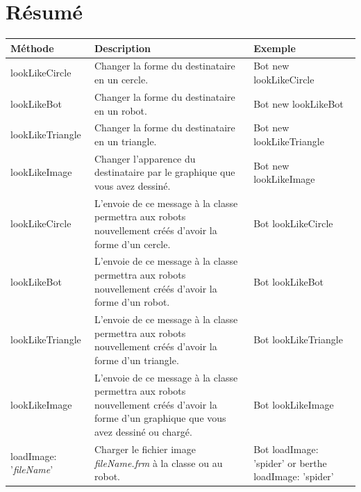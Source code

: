 \documentclass[a4paper,10pt,twoside]{book}
\begin{document}
\section{R\'esum\'e}
\noindent
{\small \begin{tabular}{p{20mm}p{50mm}p{30mm}}
\hline
\textbf{M\'ethode} & \textbf{Description} & \textbf{Exemple}\\
\hline
\textsf{lookLikeCircle} & Changer la forme du destinataire en un cercle. & \textsf{Bot new lookLikeCircle} \\

\textsf{lookLikeBot} & Changer la forme du destinataire en un robot. & \textsf{Bot new lookLikeBot} \\

\textsf{lookLikeTriangle} & Changer la forme du destinataire en un triangle. & \textsf{Bot new lookLikeTriangle} \\

\textsf{lookLikeImage} & Changer l'apparence du destinataire par le graphique que vous avez dessin\'e. & \textsf{Bot new lookLikeImage} \\

\textsf{lookLikeCircle} & L'envoie de ce message \`a la classe permettra aux robots nouvellement cr\'e\'es d'avoir la forme d'un cercle. 
& \textsf{Bot lookLikeCircle} \\

\textsf{lookLikeBot} & L'envoie de ce message \`a la classe permettra aux robots nouvellement cr\'e\'es d'avoir la forme d'un robot. & \textsf{Bot lookLikeBot} \\

\textsf{lookLikeTriangle} & L'envoie de ce message \`a la classe permettra aux robots nouvellement cr\'e\'es d'avoir la forme d'un triangle. 
& \textsf{Bot lookLikeTriangle} \\

\textsf{lookLikeImage} & L'envoie de ce message \`a la classe permettra aux robots nouvellement cr\'e\'es d'avoir la forme d'un graphique que vous avez dessin\'e ou charg\'e. & \textsf{Bot lookLikeImage} \\

\textsf{loadImage: '{\itshape fileName}'} & Charger le fichier image \emph{fileName.frm} \`a la classe ou au robot.
& \textsf{Bot loadImage: 'spider'} \newline or \newline \textsf{berthe loadImage: 'spider'} \\


\end{tabular}}
\end{document}
